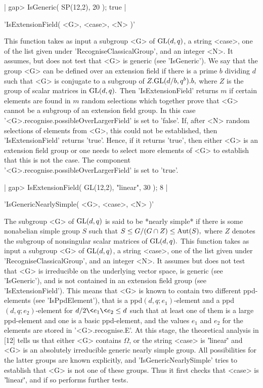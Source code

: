 |   gap> IsGeneric( SP(12,2), 20 );
    true |


'IsExtensionField( <G>, <case>, <N> )'

This function  takes  as input  a subgroup <G>  of  ${\rm GL}(d,q)$,  a string
<case>, one  of the list given under  'RecogniseClassicalGroup',  and  an
integer  <N>.   It assumes,  but does not  test that <G> is  generic (see
'IsGeneric').  We say that the group <G> can be defined over an extension
field if there is a prime $b$ dividing $d$ such that  <G> is conjugate to
a  subgroup of  $Z.{\rm GL}(d/b,q^b).b,$ where  $Z$  is the  group  of  scalar
matrices in ${\rm GL}(d,q).$  Then  'IsExtensionField' returns $m$  if certain
elements are found in $m$ random selections which together prove that <G>
cannot  be  a  subgroup  of  an extension  field  group.   In  this  case
'<G>.recognise.possibleOverLargerField' is set to 'false'. If,  after <N>
random selections of elements  from <G>, this could not  be  established,
then 'IsExtensionField'  returns 'true'.  Hence, if  it  returns  'true',
then either <G>  is an extension field group or one needs to  select more
elements of  <G> to establish  that this is  not the case. The  component
'<G>.recognise.possibleOverLargerField' is set to 'true'.

|   gap> IsExtensionField( GL(12,2), "linear", 30 );
    8 |

'IsGenericNearlySimple( <G>, <case>, <N> )'
  
The subgroup <G> of ${\rm GL}(d,q)$ is  said to be *nearly simple* if there is
some nonabelian  simple group  $S$ such that $S \le G/(G\cap Z)  \le {\rm
Aut}(S),$  where $Z$ denotes the subgroup of  nonsingular scalar matrices
of ${\rm GL}(d,q).$ This function takes as input a subgroup <G> of ${\rm GL}(d,q)$,
a string  <case>, one of the list given under  'RecogniseClassicalGroup',
and an integer <N>.  It assumes but does not test that <G> is irreducible
on the underlying vector space, is generic  (see 'IsGeneric'), and is not
contained  in an extension field  group  (see  'IsExtensionField').  This
means that  <G> is  known  to contain  two  different  ppd-elements  (see
'IsPpdElement'),  that is a ppd$(d, q;  e_1)$-element and  a  ppd$(d,  q;
e_2)$-element for  $d/2 \<  e_1 \<  e_2 \le d$ such that at  least one of
them  is a large ppd-element and one  is  a  basic  ppd-element,  and the
values $e_1$ and  $e_2$ for the elements are stored in '<G>.recognise.E'.
At this stage, the theoretical analysis in [12] tells us that  either <G>
contains $\Omega$, or the  string  <case>  is '\"linear\"'  and <G> is an
absolutely irreducible generic nearly  simple  group.   All possibilities
for the latter groups are  known explicitly,  and 'IsGenericNearlySimple'
tries to  establish that <G> is not  one of these groups.  Thus  it first
checks that <case> is '\"linear\"', and if so performs further tests.


